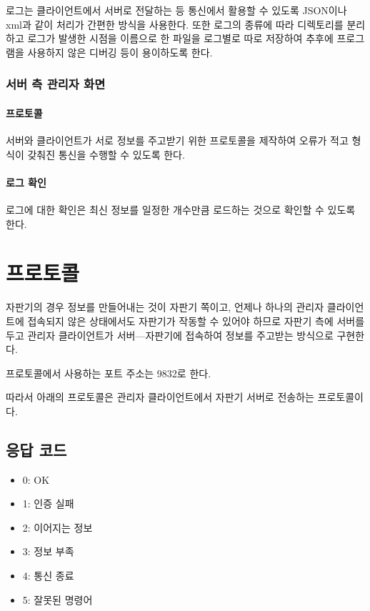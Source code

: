 \documentclass{oblivoir}
\begin{document}
    로그는 클라이언트에서 서버로 전달하는 등 통신에서 활용할 수 있도록
    JSON이나 xml과 같이 처리가 간편한 방식을 사용한다.
    또한 로그의 종류에 따라 디렉토리를 분리하고 로그가 발생한 시점을
    이름으로 한 파일을 로그별로 따로 저장하여 추후에
    프로그램을 사용하지 않은 디버깅 등이 용이하도록 한다.

    \subsubsection{서버 측 관리자 화면}

    \paragraph{프로토콜}

    서버와 클라이언트가 서로 정보를 주고받기 위한 프로토콜을 제작하여
    오류가 적고 형식이 갖춰진 통신을 수행할 수 있도록 한다.

    \paragraph{로그 확인}

    로그에 대한 확인은 최신 정보를 일정한 개수만큼 로드하는 것으로
    확인할 수 있도록 한다.

    \section{프로토콜}
    \label{sec:protocol}

    자판기의 경우 정보를 만들어내는 것이 자판기 쪽이고,
    언제나 하나의 관리자 클라이언트에 접속되지 않은 상태에서도
    자판기가 작동할 수 있어야 하므로
    자판기 측에 서버를 두고 관리자 클라이언트가 서버---자판기에 접속하여
    정보를 주고받는 방식으로 구현한다.

    프로토콜에서 사용하는 포트 주소는 9832로 한다.

    따라서 아래의 프로토콜은 관리자 클라이언트에서 자판기 서버로
    전송하는 프로토콜이다.

    \subsection{응답 코드}

    \begin{itemize}
        \item 0: OK
        \item 1: 인증 실패
        \item 2: 이어지는 정보
        \item 3: 정보 부족
        \item 4: 통신 종료
        \item 5: 잘못된 명령어
    \end{itemize}
\end{document}
